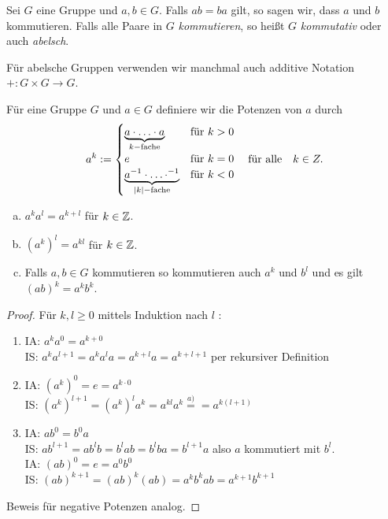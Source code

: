 \begin{definition}
	Sei $G$ eine Gruppe und $a,b \in G$. Falls $ab = ba$ gilt, so sagen wir, dass $a$ und $b$ kommutieren.
	Falls alle Paare in $G$ \emph{kommutieren}, so heißt $G$ \emph{kommutativ} oder auch \emph{abelsch}.
\end{definition}

\begin{remark}
	Für abelsche Gruppen verwenden wir manchmal auch additive Notation $+ : G \times G \to G$.
\end{remark}

\begin{definition}
	Für eine Gruppe $G$ und $a \in G$ definiere wir die Potenzen von $a$ durch
	\[
	a^{k} := \begin{cases}
		\underbrace{a \cdot \ldots \cdot a}_{k-\text{fache}} &\text{für } k > 0\\
		e &\text{für } k=0\\
		\underbrace{a^{-1} \cdot \ldots \cdot ^{-1}}_{\abs{k}-\text{fache}} &\text{für } k < 0
	\end{cases}
	\qq{für alle} k \in Z
	.\] 
\end{definition}

\begin{lemma}[Potenzregel]
	\begin{enumerate}[a)]
		\item $a^{k} a^{l} = a^{k+l}$ für $k \in \mathbb{Z}$.
		\item $(a^{k})^{l} = a^{k l}$ für  $k \in \mathbb{Z}$.
		\item Falls $a,b \in G$ kommutieren so kommutieren auch $a^{k}$ und $b^{l}$ und es gilt $(ab)^{k} = a^{k} b^{k}$.
	\end{enumerate}
\end{lemma}

\begin{proof}
	Für $k,l \geq 0$ mittels Induktion nach $l$ :
	\begin{enumerate}
		\item IA: $a^{k} a^{0} = a^{k+0}$ \\
			IS: $a^{k} a^{l+1} = a^{k} a^{l} a = a^{k+l} a = a^{k+l+1}$ per rekursiver Definition
		\item IA: $(a^{k})^{0} = e = a^{k \cdot 0}$\\
			IS: $(a^{k})^{l+1} = (a^{k})^{l} a^{k} = a^{kl} a^{k} \stackrel{a)}{=} = a^{k(l+1)}$ 
		\item IA: $a b^{0} = b^{0} a$ \\
			IS: $a b^{l+1} = a b^{l} b = b^{l} a b = b^{l} b a = b^{l+1} a$ also  $a$ kommutiert mit  $b^{l}$.\\
		IA: $(ab)^{0} = e = a^{0} b^{0}$\\ 
			IS: $(ab)^{k+1} = (ab)^{k} (ab) = a^{k} b^{k} a b = a^{k+1} b^{k+1}$
	\end{enumerate}
	Beweis für negative Potenzen analog.
\end{proof}

